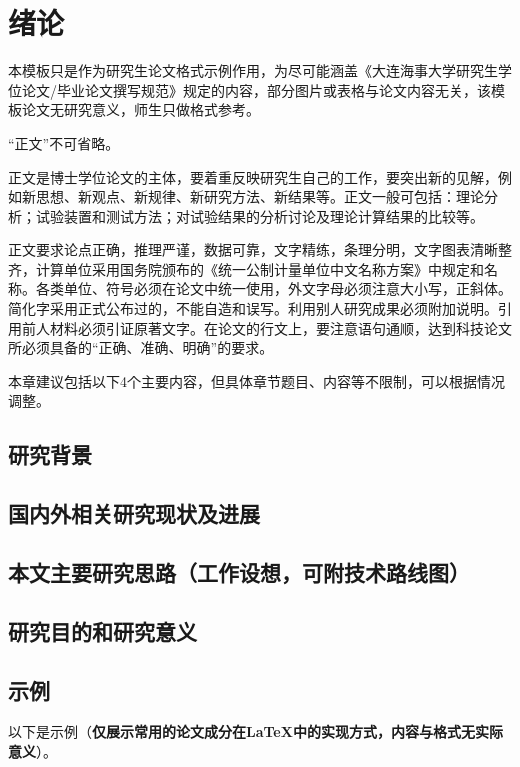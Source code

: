 
\section{绪论}

本模板只是作为研究生论文格式示例作用，为尽可能涵盖《大连海事大学研究生学位论文/毕业论文撰写规范》规定的内容，部分图片或表格与论文内容无关，该模板论文无研究意义，师生只做格式参考。

“正文”不可省略。

正文是博士学位论文的主体，要着重反映研究生自己的工作，要突出新的见解，例如新思想、新观点、新规律、新研究方法、新结果等。正文一般可包括：理论分析；试验装置和测试方法；对试验结果的分析讨论及理论计算结果的比较等。

正文要求论点正确，推理严谨，数据可靠，文字精练，条理分明，文字图表清晰整齐，计算单位采用国务院颁布的《统一公制计量单位中文名称方案》中规定和名称。各类单位、符号必须在论文中统一使用，外文字母必须注意大小写，正斜体。简化字采用正式公布过的，不能自造和误写。利用别人研究成果必须附加说明。引用前人材料必须引证原著文字。在论文的行文上，要注意语句通顺，达到科技论文所必须具备的“正确、准确、明确”的要求。

本章建议包括以下4个主要内容，但具体章节题目、内容等不限制，可以根据情况调整。

\subsection{研究背景}

\subsection{国内外相关研究现状及进展}

\subsection{本文主要研究思路（工作设想，可附技术路线图）}

\subsection{研究目的和研究意义}

\subsection{示例}

以下是示例（{\bf 仅展示常用的论文成分在LaTeX中的实现方式，内容与格式无实际意义}）。

